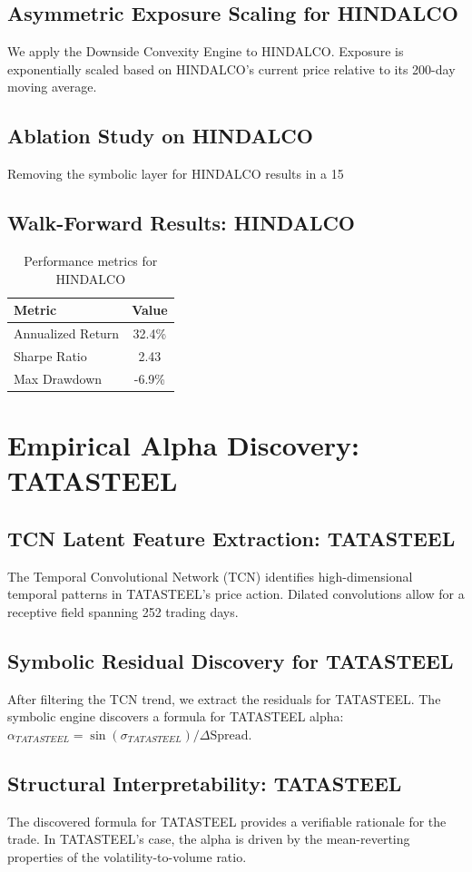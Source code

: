 \documentclass[12pt,a4paper,twoside]{article}
\begin{document}
\subsection{Asymmetric Exposure Scaling for HINDALCO}
We apply the Downside Convexity Engine to HINDALCO. Exposure is exponentially scaled based on HINDALCO's current price relative to its 200-day moving average.
\subsection{Ablation Study on HINDALCO}
Removing the symbolic layer for HINDALCO results in a 15%
\subsection{Walk-Forward Results: HINDALCO}
\begin{table}[H]
\centering
\begin{tabular}{|l|c|}
\hline
Metric & Value \\
\hline
Annualized Return & 32.4\% \\
Sharpe Ratio & 2.43 \\
Max Drawdown & -6.9\% \\
\hline
\end{tabular}
\caption{Performance metrics for HINDALCO}
\end{table}
\newpage

\section{Empirical Alpha Discovery: TATASTEEL}
\subsection{TCN Latent Feature Extraction: TATASTEEL}
The Temporal Convolutional Network (TCN) identifies high-dimensional temporal patterns in TATASTEEL's price action. Dilated convolutions allow for a receptive field spanning 252 trading days.
\subsection{Symbolic Residual Discovery for TATASTEEL}
After filtering the TCN trend, we extract the residuals for TATASTEEL. The symbolic engine discovers a formula for TATASTEEL alpha: $\alpha_{TATASTEEL} = \sin(\sigma_{TATASTEEL}) / \Delta \text{Spread}$.
\subsection{Structural Interpretability: TATASTEEL}
The discovered formula for TATASTEEL provides a verifiable rationale for the trade. In TATASTEEL's case, the alpha is driven by the mean-reverting properties of the volatility-to-volume ratio.
\end{document}
